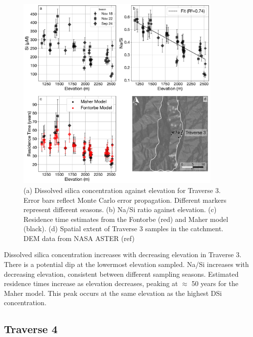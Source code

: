 \begin{figure}[h]
    \centering
        \includegraphics[width=0.9\textwidth]{Traverse_3_summary.pdf}
    \caption{(a) Dissolved silica concentration against elevation for Traverse 3. Error bars reflect Monte Carlo error propagation. Different markers represent different seasons. (b) Na/Si ratio against elevation. (c) Residence time estimates from the Fontorbe (red) and Maher model (black). (d) Spatial extent of Traverse 3 samples in the catchment. DEM data from NASA ASTER (ref)}
    \label{fig:trav3}
\end{figure}

\FloatBarrier

Dissolved silica concentration increases with decreasing elevation in Traverse 3. There is a potential dip at the lowermost elevation sampled. Na/Si increases with decreasing elevation, consistent between different sampling seasons. Estimated residence times increase as elevation decreases, peaking at $\approx$ 50 years for the Maher model. This peak occurs at the same elevation as the highest DSi concentration.



\subsection{Traverse 4}

